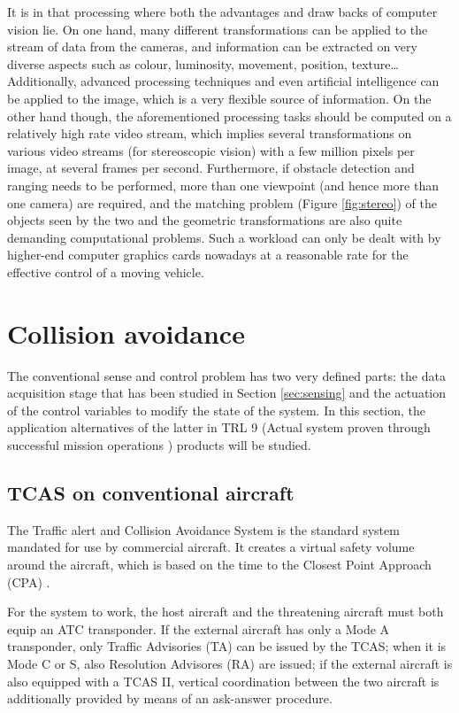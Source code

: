 It is in that processing where both the advantages and draw backs of computer vision lie.
On one hand, many different transformations can be applied to the stream of data from the cameras, and information can be extracted on very diverse aspects such as colour, luminosity, movement, position, texture\dots \cite{ballard1982} 
Additionally, advanced processing techniques and even artificial intelligence can be applied to the image, which is a very flexible source of information.
On the other hand though, the aforementioned processing tasks should be computed on a relatively high rate video stream, which implies several transformations on various video streams (for stereoscopic vision) with a few million pixels per image, at several frames per second.
Furthermore, if obstacle detection and ranging needs to be performed, more than one viewpoint (and hence more than one camera) are required, and the matching problem (Figure \ref{fig:stereo}) of the objects seen by the two and the geometric transformations are also quite demanding computational problems.
Such a workload can only be dealt with by higher-end computer graphics cards nowadays at a reasonable rate for the effective control of a moving vehicle.



\section{Collision avoidance}

The conventional sense and control problem has two very defined parts: the data acquisition stage that has been studied in Section \ref{sec:sensing} and the actuation of the control variables to modify the state of the system.
In this section, the application alternatives of the latter in TRL 9 (Actual system proven through successful mission operations \cite{assistantsecretaryofdefenseforresearchandengineering2011}) products will be studied.

\subsection{TCAS on conventional aircraft}

The Traffic alert and Collision Avoidance System is the standard system mandated for use by commercial aircraft.
It creates a virtual safety volume around the aircraft, which is based on the time to the Closest Point Approach (CPA) \cite{tooley2009}.

For the system to work, the host aircraft and the threatening aircraft must both equip an ATC transponder.
If the external aircraft has only a Mode A transponder, only Traffic Advisories (TA) can be issued by the TCAS; when it is Mode C or S, also Resolution Advisores (RA) are issued; if the external aircraft is also equipped with a TCAS II, vertical coordination between the two aircraft is additionally provided by means of an ask-answer procedure.

